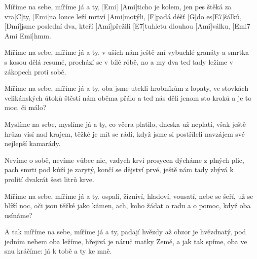 
\sloka
[Ami]Míříme na sebe, míříme já a ty, [Emi]
[Ami]ticho je kolem, jen pes štěká za vra[C]ty,
[Emi]na louce leží mrtví [Ami]motýli,
[F]padá déšť [G]do es[E7]šálků,
[Dmi]jsme poslední dva, kteří [Ami]přežili
[E7]tuhletu dlouhou [Ami]válku, [Emi7 Ami Emi]hmm.

\sloka
Míříme na sebe, míříme já a ty,
v uších nám ještě zní vybuchlé granáty
a smrtka s kosou dělá resumé,
prochází se v bílé róbě,
no a my dva teď tady ležíme
v zákopech proti sobě.

\sloka
Míříme na sebe, míříme já a ty,
oba jsme utekli hrobníkům z lopaty,
ve stovkách velikánských útoků
štěstí nám oběma přálo
a teď nás dělí jenom sto kroků
a je to moc, či málo?

\sloka
Myslíme na sebe, myslíme já a ty,
co včera platilo, dneska už neplatí,
však ještě hrůza visí nad krajem,
těžké je mít se rádi,
když jsme si postříleli navzájem
své nejlepší kamarády.

\sloka
Nevíme o sobě, nevíme vůbec nic,
vzdych krví prosycen dýcháme z plných plic,
pach smrti pod kůží je zarytý,
končí se dějství prvé,
ještě nám tady zbývá k prolití
dvakrát šest litrů krve.

\sloka
Míříme na sebe, míříme já a ty,
ospalí, žízniví, hladoví, vousatí,
nebe se šeří, už se blíží noc,
oči jsou těžké jako kámen,
ach, koho žádat o radu a o pomoc,
když oba usínáme?

\sloka
A tak míříme na sebe, míříme já a ty,
padají hvězdy až obzor je hvězdnatý,
pod jedním nebem oba ležíme,
hřejivá je náruč matky Země,
a jak tak spíme, oba ve snu kráčíme:
já k tobě a ty ke mně.
